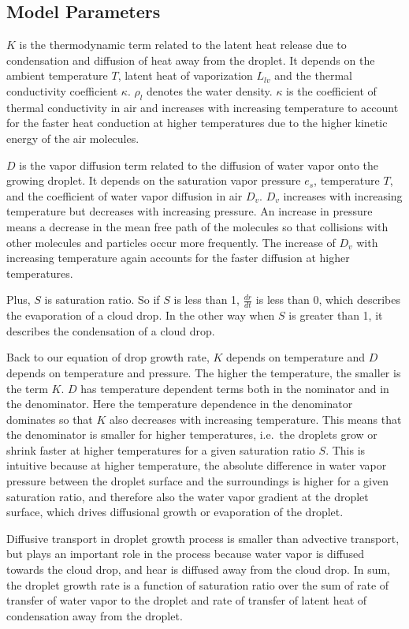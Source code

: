 \documentclass[]{article}
\begin{document}
\subsection{Model Parameters}
$K$ is the thermodynamic term related to the latent heat release due to
condensation and diffusion of heat away from the droplet. It depends on the
ambient temperature $T$, latent heat of vaporization $L_{lv}$ and the thermal
conductivity coefficient $\kappa$. $\rho_l$ denotes the water density.
$\kappa$ is the coefficient of thermal conductivity in air and increases with
increasing temperature to account for the faster heat conduction at higher
temperatures due to the higher kinetic energy of the air molecules.

$D$ is the vapor diffusion term related to the diffusion of water vapor onto
the growing droplet. It depends on the saturation vapor pressure $e_{s}$,
temperature $T$, and the coefficient of water vapor diffusion in air $D_v$.
$D_v$ increases with increasing temperature but decreases with increasing
pressure. An increase in pressure means a decrease in the mean free path of the
molecules so that collisions with other molecules and particles occur more
frequently. The increase of  $D_v$ with increasing temperature again accounts
for the faster diffusion at higher temperatures.

Plus, $S$ is saturation ratio. So if $S$ is less than 1, $\frac{dr}{dt}$ is
less than 0, which describes the evaporation of a cloud drop. In the other way
when $S$ is greater than 1, it describes the condensation of a cloud drop.

Back to our equation of drop growth rate, $K$ depends on temperature and $D$
depends on temperature and pressure. The higher the temperature, the smaller is
the term $K$. $D$ has temperature dependent terms both in the nominator and in
the denominator.  Here the temperature dependence in the denominator dominates
so that $K$ also decreases with increasing temperature. This means that the
denominator is smaller for higher temperatures, i.e.\ the droplets grow or
shrink faster at higher temperatures for a given saturation ratio $S$. This is
intuitive because at higher temperature, the absolute difference in water vapor
pressure between the droplet surface and the surroundings is higher for a given
saturation ratio, and therefore also the water vapor gradient at the droplet
surface, which drives diffusional growth or evaporation of the droplet.

Diffusive transport in droplet growth process is smaller than advective
transport, but plays an important role in the process because  water vapor is
diffused towards the cloud drop, and hear is diffused away from the cloud drop.
In sum, the droplet growth rate is a function of saturation ratio over the sum
of rate of transfer of water vapor to the droplet and rate of transfer of
latent heat of condensation away from the droplet.
\end{document}
